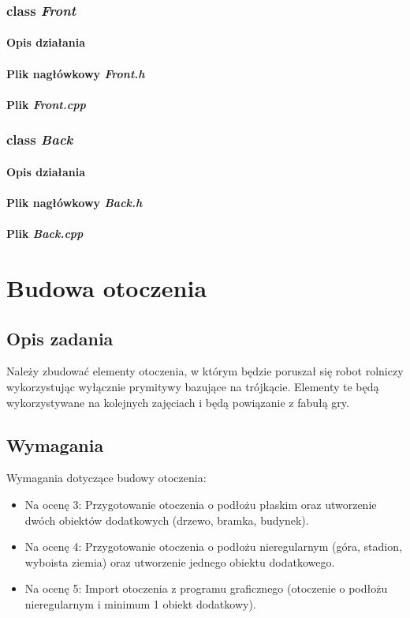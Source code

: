\documentclass[a4paper, 12pt]{report}
\begin{document}
\subsection{class \emph{Front}}
\subsubsection{Opis działania}
\subsubsection{Plik nagłówkowy \emph{Front.h}}

\subsubsection{Plik \emph{Front.cpp}}


\subsection{class \emph{Back}}
\subsubsection{Opis działania}
\subsubsection{Plik nagłówkowy \emph{Back.h}}

\subsubsection{Plik \emph{Back.cpp}}


\chapter{Budowa otoczenia}
\section{Opis zadania}
Należy zbudować elementy otoczenia, w którym będzie poruszał się robot rolniczy wykorzystując wyłącznie prymitywy bazujące na trójkącie. Elementy te będą wykorzystywane na kolejnych zajęciach i będą powiązanie z fabułą gry.
\section{Wymagania}
Wymagania dotyczące budowy otoczenia:
\begin{itemize}
\item Na ocenę 3: Przygotowanie otoczenia o podłożu płaskim oraz utworzenie dwóch obiektów dodatkowych (drzewo, bramka, budynek).
\item Na ocenę 4: Przygotowanie otoczenia o podłożu nieregularnym (góra, stadion, wyboista ziemia) oraz utworzenie jednego obiektu dodatkowego.
\item Na ocenę 5: Import otoczenia z programu graficznego (otoczenie o podłożu nieregularnym i minimum 1 obiekt dodatkowy).
\end{itemize}
\end{document}
